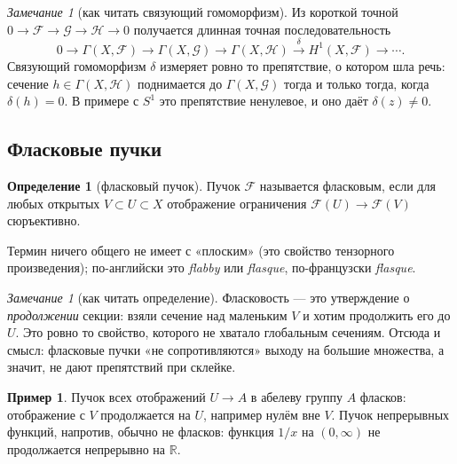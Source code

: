 \documentclass[11pt,b5paper]{article}
\newcommand{\Shv}[1]{\mathscr{#1}}   %
\newcommand{\R}{\mathbb{R}}
\theoremstyle{plain}
\theoremstyle{definition}
\newtheorem{defninner}[thminner]{Определение}
\newtheorem{exminner}[thminner]{Пример}
\theoremstyle{remark}
\newtheorem{reminner}[thminner]{Замечание}
\newcommand{\thmbeg}{%
  \par\smallskip
  \begin{lrbox}{\thmbox}%
  \begin{minipage}{\linewidth}}
\newcommand{\thmend}{%
  \end{minipage}%
  \end{lrbox}%
  \noindent\usebox{\thmbox}%
  \par\smallskip}
\newenvironment{defn}{\thmbeg\begin{defninner}}{\end{defninner}\thmend}
\newenvironment{exm}{\thmbeg\begin{exminner}}{\end{exminner}\thmend}
\newenvironment{rem}{\thmbeg\begin{reminner}}{\end{reminner}\thmend}
\theoremstyle{definition}
\renewcommand{\thmbeg}{\par\smallskip}
\renewcommand{\thmend}{\par\smallskip}
\let\brutsubsection\subsection
\renewcommand{\subsection}{\Needspace{5\baselineskip}\brutsubsection}
\begin{document}
\begin{rem}[как читать связующий гомоморфизм]
Из короткой точной $0\to\Shv{F}\to\Shv{G}\to\Shv{H}\to0$ получается
длинная точная последовательность
\[
  0\to\Gamma(X,\Shv{F})\to\Gamma(X,\Shv{G})\to\Gamma(X,\Shv{H})
  \xrightarrow{\delta}H^1(X,\Shv{F})\longrightarrow\cdots.
\]
Связующий гомоморфизм $\delta$ измеряет ровно то препятствие, о
котором шла речь: сечение $h\in\Gamma(X,\Shv{H})$ поднимается до
$\Gamma(X,\Shv{G})$ тогда и только тогда, когда $\delta(h)=0$. В
примере с $S^1$ это препятствие ненулевое, и оно даёт
$\delta(z)\ne0$.
\end{rem}

\subsection{Фласковые пучки}
\begin{defn}[фласковый пучок]
Пучок $\Shv{F}$ называется фласковым, если для любых открытых
$V\subset U\subset X$ отображение ограничения
$\Shv{F}(U)\to\Shv{F}(V)$ сюръективно.
\end{defn}

Термин ничего общего не имеет с «плоским» (это свойство тензорного
произведения); по-английски это \emph{flabby} или \emph{flasque},
по-французски \emph{flasque}.

\begin{rem}[как читать определение]
Фласковость --- это утверждение о \emph{продолжении} секции: взяли
сечение над маленьким $V$ и хотим продолжить его до $U$. Это
ровно то свойство, которого не хватало глобальным сечениям.
Отсюда и смысл: фласковые пучки «не сопротивляются» выходу на
большие множества, а значит, не дают препятствий при склейке.
\end{rem}

\begin{exm}
Пучок всех отображений $U\to A$ в абелеву группу $A$ фласков:
отображение с $V$ продолжается на $U$, например нулём вне $V$.
Пучок непрерывных функций, напротив, обычно не фласков: функция
$1/x$ на $(0,\infty)$ не продолжается непрерывно на $\R$.
\end{exm}
\end{document}
